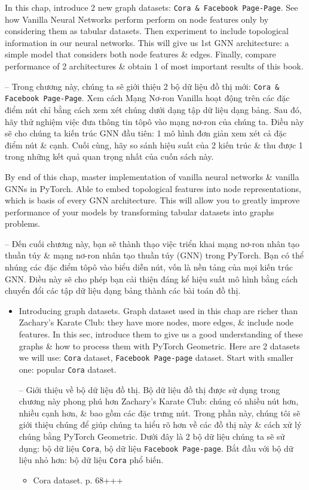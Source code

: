 \documentclass{article}
\begin{document}
\begin{itemize}
    In this chap, introduce 2 new graph datasets: {\tt Cora \& Facebook Page-Page}. See how Vanilla Neural Networks perform perform on node features only by considering them as tabular datasets. Then experiment to include topological information in our neural networks. This will give us 1st GNN architecture: a simple model that considers both node features \& edges. Finally, compare performance of 2 architectures \& obtain 1 of most important results of this book.

    -- Trong chương này, chúng ta sẽ giới thiệu 2 bộ dữ liệu đồ thị mới: {\tt Cora \& Facebook Page-Page}. Xem cách Mạng Nơ-ron Vanilla hoạt động trên các đặc điểm nút chỉ bằng cách xem xét chúng dưới dạng tập dữ liệu dạng bảng. Sau đó, hãy thử nghiệm việc đưa thông tin tôpô vào mạng nơ-ron của chúng ta. Điều này sẽ cho chúng ta kiến trúc GNN đầu tiên: 1 mô hình đơn giản xem xét cả đặc điểm nút \& cạnh. Cuối cùng, hãy so sánh hiệu suất của 2 kiến trúc \& thu được 1 trong những kết quả quan trọng nhất của cuốn sách này.

    By end of this chap, master implementation of vanilla neural networks \& vanilla GNNs in PyTorch. Able to embed topological features into node representations, which is basis of every GNN architecture. This will allow you to greatly improve performance of your models by transforming tabular datasets into graphs problems.

    -- Đến cuối chương này, bạn sẽ thành thạo việc triển khai mạng nơ-ron nhân tạo thuần túy \& mạng nơ-ron nhân tạo thuần túy (GNN) trong PyTorch. Bạn có thể nhúng các đặc điểm tôpô vào biểu diễn nút, vốn là nền tảng của mọi kiến trúc GNN. Điều này sẽ cho phép bạn cải thiện đáng kể hiệu suất mô hình bằng cách chuyển đổi các tập dữ liệu dạng bảng thành các bài toán đồ thị.
    \begin{itemize}
        \item {\sf Introducing graph datasets.} Graph dataset used in this chap are richer than Zachary's Karate Club: they have more nodes, more edges, \& include node features. In this sec, introduce them to give us a good understanding of these graphs \& how to process them with PyTorch Geometric. Here are 2 datasets we will use: {\tt Cora} dataset, {\tt Facebook Page-page} dataset. Start with smaller one: popular {\tt Cora} dataset.

        -- {\sf Giới thiệu về bộ dữ liệu đồ thị.} Bộ dữ liệu đồ thị được sử dụng trong chương này phong phú hơn Zachary's Karate Club: chúng có nhiều nút hơn, nhiều cạnh hơn, \& bao gồm các đặc trưng nút. Trong phần này, chúng tôi sẽ giới thiệu chúng để giúp chúng ta hiểu rõ hơn về các đồ thị này \& cách xử lý chúng bằng PyTorch Geometric. Dưới đây là 2 bộ dữ liệu chúng ta sẽ sử dụng: bộ dữ liệu {\tt Cora}, bộ dữ liệu {\tt Facebook Page-page}. Bắt đầu với bộ dữ liệu nhỏ hơn: bộ dữ liệu {\tt Cora} phổ biến.
        \begin{itemize}
            \item {\sf Cora dataset.} p. 68+++
        \end{itemize}


\end{itemize}
\end{itemize}
\end{document}
